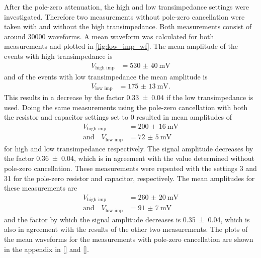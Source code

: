 After the pole-zero attenuation, the high and low transimpedance settings were investigated.
Therefore two measurements without pole-zero cancellation were taken with and without the high transimpedance.
Both measurements consist of around \num{30000} waveforms.
A mean waveform was calculated for both measurements and plotted in \autoref{fig:low_imp_wf}.
The mean amplitude of the events with high transimpedance is
\begin{align}
	V_\text{high imp} &= \SI{530(40)}{\milli\volt}
\end{align}
and of the events with low transimpedance the mean amplitude is
\begin{align}
	V_\text{low imp} &= \SI{175(13)}{\milli\volt}.
\end{align}
This results in a decrease by the factor \num{0.33(4)} if the low transimpedance is used.
Doing the same measurements using the pole-zero cancellation with both the resistor and capacitor settings set to 0 resulted in mean amplitudes of
\begin{align}
	V_\text{high imp} &= \SI{200(16)}{\milli\volt}\\
	\text{and}\quad V_\text{low imp} &= \SI{72(5)}{\milli\volt}
\end{align}
for high and low transimpedance respectively.
The signal amplitude decreases by the factor \num{0.36(4)}, which is in agreement with the value determined without pole-zero cancellation.
These measurements were repeated with the settings 3 and 31 for the pole-zero resistor and capacitor, respectively.
The mean amplitudes for these measurements are
\begin{align}
	V_\text{high imp} &= \SI{260(20)}{\milli\volt}\\
	\text{and}\quad V_\text{low imp} &= \SI{91(7)}{\milli\volt}
\end{align}
and the factor by which the signal amplitude decreases is \num{0.35(4)}, which is also in agreement with the results of the other two measurements.
The plots of the mean waveforms for the measurements with pole-zero cancellation are shown in the appendix in \autoref{} and \autoref{}.
